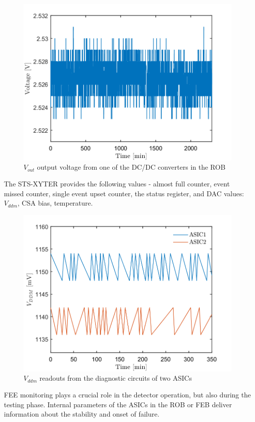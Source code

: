 \begin{figure}[!h]
    \centering
    \includegraphics[width=0.65\columnwidth]{Chapter4/images/ROB.png}
    \caption{$V_{out}$ output voltage from one of the DC/DC converters in the \gls{ROB}}
    \label{fig:ROB}
\end{figure}

The STS-XYTER provides the following values - almost full counter, event missed counter, single event upset counter, the status register, and \gls{DAC} values: $V_{ddm}$, \gls{CSA} bias, temperature. 

\begin{figure}[!h]
    \centering
    \includegraphics[width=0.65\columnwidth]{Chapter4/images/FEB.png}
    \caption{$V_{ddm}$ readouts from the diagnostic circuits of two ASICs}
    \label{fig:vddm_first}
\end{figure}

\gls{FEE} monitoring plays a crucial role in the detector operation, but also during the testing phase. Internal parameters of the \glspl{ASIC} in the \gls{ROB} or \gls{FEB} deliver information about the stability and onset of failure.  %
